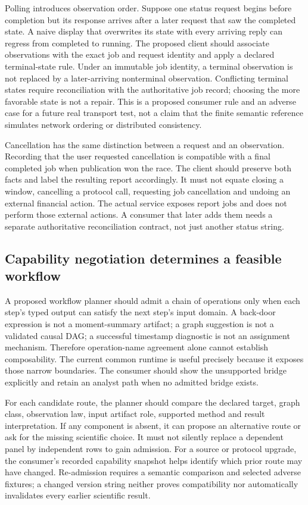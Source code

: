 Polling introduces observation order. Suppose one status request begins
before completion but its response arrives after a later request that saw
the completed state. A naive display that overwrites its state with every
arriving reply can regress from completed to running. The proposed client
should associate observations with the exact job and request identity and
apply a declared terminal-state rule. Under an immutable job identity, a
terminal observation is not replaced by a later-arriving nonterminal
observation. Conflicting terminal states require reconciliation with the
authoritative job record; choosing the more favorable state is not a repair.
This is a proposed consumer rule and an adverse case for a future real
transport test, not a claim that the finite semantic reference simulates
network ordering or distributed consistency.

Cancellation has the same distinction between a request and an observation.
Recording that the user requested cancellation is compatible with a final
completed job when publication won the race. The client should preserve both
facts and label the resulting report accordingly. It must not equate closing
a window, cancelling a protocol call, requesting job cancellation and undoing
an external financial action. The actual service exposes report jobs and
does not perform those external actions. A consumer that later adds them
needs a separate authoritative reconciliation contract, not just another
status string.

\subsection{Capability negotiation determines a feasible workflow}

A proposed workflow planner should admit a chain of operations only when
each step's typed output can satisfy the next step's input domain. A
back-door expression is not a moment-summary artifact; a graph suggestion
is not a validated causal DAG; a successful timestamp diagnostic is not an
assignment mechanism. Therefore operation-name agreement alone cannot
establish composability. The current common runtime is useful precisely
because it exposes those narrow boundaries. The consumer should show the
unsupported bridge explicitly and retain an analyst path when no admitted
bridge exists.

For each candidate route, the planner should compare the declared target,
graph class, observation law, input artifact role, supported method and
result interpretation. If any component is absent, it can propose an
alternative route or ask for the missing scientific choice. It must not
silently replace a dependent panel by independent rows to gain admission.
For a source or protocol upgrade, the consumer's recorded capability snapshot
helps identify which prior route may have changed. Re-admission requires a
semantic comparison and selected adverse fixtures; a changed version string
neither proves compatibility nor automatically invalidates every earlier
scientific result.

